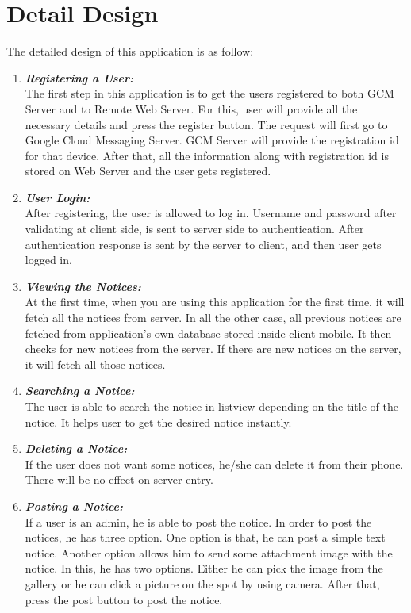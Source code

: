 \section{Detail Design}
The detailed design of this application is as follow:
\begin{enumerate}
\item \textbf{\emph{Registering a User:}}\\
The first step in this application is to get the users registered to both GCM Server and to Remote Web Server. For this, user will provide all the necessary details and press the register button. The request will first go to Google Cloud Messaging Server. GCM Server will provide
the registration id for that device. After that, all the information along with registration id is stored on Web Server and the user gets registered.

\item \textbf{\emph{User Login:}}\\
After registering, the user is allowed to log in. Username and password after validating at client side, is sent to server side to authentication. After authentication response is sent by the server to client, and then user gets logged in.

\item \textbf{\emph{Viewing the Notices:}}\\
At the first time, when you are using this application for the first time, it will fetch all the notices from server. In all the other case, all previous notices are fetched from application's own database stored inside client mobile. It then checks for new notices from the server. 
If there are new notices on the server, it will fetch all those notices.

\item \textbf{\emph{Searching a Notice:}}\\
The user is able to search the notice in listview depending on the title of the notice. It helps user to get the desired notice instantly.

\item \textbf{\emph{Deleting a Notice:}}\\
If the user does not want some notices, he/she can delete it from their phone. There will be no effect on server entry.

\item \textbf{\emph{Posting a Notice:}}\\
If a user is an admin, he is able to post the notice. In order to post the notices, he has three option. One option is that, he can post a simple text notice. Another option allows him to send some attachment image with the notice. In this, he has two options.
Either he can pick the image from the gallery or he can click a picture on the spot by using camera.
After that, press the post button to post the notice.


\end{enumerate}
